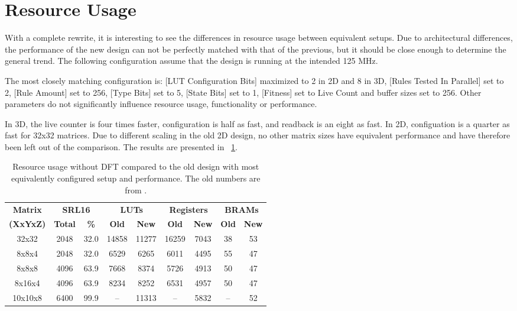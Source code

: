 \section{Resource Usage}

With a complete rewrite, it is interesting to see the differences in resource usage between equivalent setups.
Due to architectural differences, the performance of the new design can not be perfectly matched with that of the previous, but it should be close enough to determine the general trend.
The following configuration assume that the design is running at the intended 125 MHz.

The most closely matching configuration is:
[LUT Configuration Bits] maximized to 2 in 2D and 8 in 3D,
[Rules Tested In Parallel] set to 2,
[Rule Amount] set to 256,
[Type Bits] set to 5,
[State Bits] set to 1,
[Fitness] set to Live Count
and buffer sizes set to 256.
Other parameters do not significantly influence resource usage, functionality or performance.

In 3D, the live counter is four times faster, configuration is half as fast, and readback is an eight as fast.
In 2D, configuation is a quarter as fast for 32x32 matrices.
Due to different scaling in the old 2D design, no other matrix sizes have equivalent performance and have therefore been left out of the comparison.
The results are presented in \tablename~\ref{tab:resource-usage}.

\begin{table}[!ht]
    \renewcommand{\arraystretch}{1.4}
    \centering
    \begin{tabular}{c|c|c|c|c|c|c|c|c}
        \bfseries Matrix & \multicolumn{2}{c|}{\bfseries SRL16} & \multicolumn{2}{c|}{\bfseries LUTs} & \multicolumn{2}{c|}{\bfseries Registers} & \multicolumn{2}{c}{\bfseries BRAMs} \\
        \bfseries (XxYxZ) & \bfseries Total & \bfseries \% & \bfseries Old & \bfseries New & \bfseries Old & \bfseries New & \bfseries Old & \bfseries New \\
        \hline
        32x32 & 2048 & 32.0 & 14858 & 11277 & 16259 & 7043 & 38 & 53 \\
        8x8x4 & 2048 & 32.0 & 6529 & 6265 & 6011 & 4495 & 55 & 47 \\
        8x8x8 & 4096 & 63.9 & 7668 & 8374 & 5726 & 4913 & 50 & 47 \\
        8x16x4 & 4096 & 63.9 & 8234 & 8252 & 6531 & 4957 & 50 & 47 \\
        10x10x8 & 6400 & 99.9 & – & 11313 & – & 5832 & – & 52 \\
    \end{tabular}
    \caption[Resource usage]{
        Resource usage without DFT compared to the old design with most equivalently configured setup and performance.
        The old numbers are from \cite{stovneng2014sblock}.
    }
    \label{tab:resource-usage}
\end{table}

